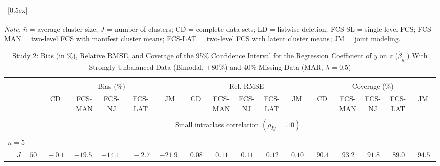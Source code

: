 \begin{sidewaystable}
\begin{threeparttable}
\begin{tabular}{llccccccccccccccc}
[0.5ex]\hline\\[-1.6ex] 
\end{tabular}
\begin{tablenotes}{\footnotesize \textit{Note.} $\bar{n}$ = average cluster size; $J$ = number of clusters; CD = complete data sets; LD = listwise deletion; FCS-SL = single-level FCS; FCS-MAN = two-level FCS with manifest cluster means; FCS-LAT = two-level FCS with latent cluster means; JM = joint modeling.}\end{tablenotes}
\end{threeparttable}
\end{sidewaystable}
\begin{sidewaystable}
\begin{threeparttable}
\setlength{\tabcolsep}{1.0pt}
\renewcommand{\arraystretch}{0.95}
\footnotesize
\caption{\small Study 2: Bias (in \%), Relative RMSE, and Coverage of the 95\% Confidence Interval for the Regression Coefficient of $y$ on $z$ ($\hat\beta_{yz}$) With Strongly Unbalanced Data (Bimodal, $\pm 80\%$) and 40\% Missing Data (MAR, $\lambda=0.5$)}
\begin{tabular}{llccccccccccccccc}
\hline\\[-1.8ex]
& & \multicolumn{5}{c}{Bias (\%)} & \multicolumn{5}{c}{Rel. RMSE} & \multicolumn{5}{c}{Coverage (\%)} \\ \cmidrule(r){3-7}\cmidrule(r){8-12}\cmidrule(r){13-17}
 &  & CD & \makecell{FCS-\\MAN} & \makecell{FCS-\\NJ} & \makecell{FCS-\\LAT} & JM & CD & \makecell{FCS-\\MAN} & \makecell{FCS-\\NJ} & \makecell{FCS-\\LAT} & JM & CD & \makecell{FCS-\\MAN} & \makecell{FCS-\\NJ} & \makecell{FCS-\\LAT} & \multicolumn{1}{c}{JM} \\ 
[0.4ex]\hline\\[-1.8ex]
& & \multicolumn{15}{c}{Small intraclass correlation $(\rho_{Iy}=.10)$} \\[0.6ex]\hline\\[-1.8ex]
\multicolumn{4}{l}{$\bar{n}=5$} \\  & \nopagebreak $\;J=50$  & $\phantom{0}{-}0.1\phantom{0}$ & ${-}19.5\phantom{0}$ & ${-}14.1\phantom{0}$ & $\phantom{0}{-}2.7\phantom{0}$ & ${-}21.9\phantom{0}$ & $\phantom{0}0.08\phantom{0}$ & $\phantom{0}0.11\phantom{0}$ & $\phantom{0}0.11\phantom{0}$ & $\phantom{0}0.12\phantom{0}$ & $\phantom{0}0.10\phantom{0}$ & $\phantom{0}90.4\phantom{0}$ & $\phantom{0}93.2\phantom{0}$ & $\phantom{0}91.8\phantom{0}$ & $\phantom{0}89.0\phantom{0}$ & $\phantom{0}94.5\phantom{0}$ \\

\end{tabular}
\end{threeparttable}
\end{sidewaystable}

